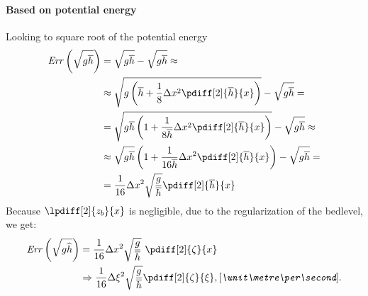 \paragraph*{Based on potential energy}
Looking to square root of the potential energy
\begin{align}
    {\it Err}\left(\sqrt{g\hbar}\right) & = \sqrt{g\hbar} - \sqrt{g\hbar} \approx
    \\
    & \approx \sqrt{g\left(\hbar + \frac{1}{8}\Dx^2\pdiff[2]{\hbar}{x}\right)} - \sqrt{g\hbar} =
    \\
    & = \sqrt{g\hbar\left(1 + \frac{1}{8\hbar}\Dx^2\pdiff[2]{\hbar}{x}\right)} - \sqrt{g\hbar} \approx
    \\
    &\approx \sqrt{g\hbar}\left(1 + \frac{1}{16\hbar}\Dx^2 \pdiff[2]{\hbar}{x}\right) - \sqrt{g\hbar} =
    \\
    & = \frac{1}{16} \Dx^2 \sqrt{\frac{g}{\hbar}}\pdiff[2]{\hbar}{x}
\end{align}
Because $\lpdiff[2]{z_b}{x}$ is negligible, due to the regularization of the bedlevel, we get:
\begin{align}
    {\it Err}\left(\sqrt{g\hhat}\right)  & = \frac{1}{16} \Dx^2 \sqrt{\frac{g}{\hbar}}\ \pdiff[2]{\zeta}{x}
    \\
    & \Rightarrow \frac{1}{16} \Dxi^2 \sqrt{\frac{g}{\hbar}}\pdiff[2]{\zeta}{\xi}, \bunit{\metre\per\second}.
\end{align}
\phantom{text}
%
